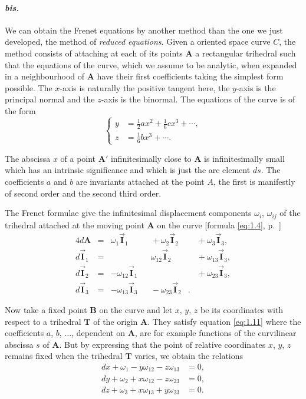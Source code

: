 \documentclass[leqno,11pt]{book}
\numberwithin{equation}{chapter}
\theoremstyle{shape1}
\theoremstyle{shapesmall}
\newcommand{\rvec}[1]{\vec{\mathbf{#1}}}
\newcommand{\ivec}{\rvec{I}}
\begin{document}
\paragraph{\textnormal{\textit{bis.}}}
\label{sec:21a}
We can obtain the Frenet equations by another method than the one we just developed, the method of \emph{reduced equations}. Given a oriented space curve $C$, the method consists of attaching at each of its points $\mathbf{A}$ a rectangular trihedral such that the equations of the curve, which we assume to be analytic, when expanded in a neighbourhood of $\mathbf{A}$ have their first coefficients taking the simplest form possible. The $x$-axis is naturally the positive tangent here, the $y$-axis is the principal normal and the $z$-axis is the binormal. The equations of the curve is of the form
\begin{equation}
  \label{eq:1.11}
  \left\{
    \begin{aligned}      
      y&=\frac{1}{2}ax^{2}+\frac{1}{6}cx^{3}+\cdots,\\
      z&=\frac{1}{6}bx^{3}+\cdots.
    \end{aligned}      
  \right.
\end{equation}

The abscissa $x$ of a point $\mathbf{A}'$ infinitesimally close to $\mathbf{A}$ is infinitesimally small which has an intrinsic significance and which is just the arc element $ds$. The coefficients $a$ and $b$ are invariants attached at the point $A$, the first is manifestly of second order and the second third order.

The Frenet formulae give the infinitesimal displacement components $\omega_{i}$, $\omega_{ij}$ of the trihedral attached at the moving point $\mathbf{A}$ on the curve [formula \eqref{eq:1.4}, p.~\pageref{eq:1.4}]
\begin{alignat*}{4}
  d\mathbf{A}&={}&{}\omega_{1}\ivec_{1}&&{}+{}\omega_{2}\ivec_{2}&&{}+{}\omega_{3}\ivec_{3},\\
  d\ivec_{1}&=&&&\omega_{12}\ivec_{2}&&{}+{}\omega_{13}\ivec_{3},\\
  d\ivec_{2}&=&-\omega_{12}\ivec_{1}&&&&{}+{}\omega_{23}\ivec_{3},\\
  d\ivec_{3}&=&-\omega_{13}\ivec_{3}&&{}-{}\omega_{23}\ivec_{2}&.&
\end{alignat*}

Now take a fixed point $\mathbf{B}$ on the curve and let $x$, $y$, $z$ be its coordinates with respect to a trihedral $\mathbf{T}$ of the origin $\mathbf{A}$. They satisfy equation \eqref{eq:1.11} where the coefficients $a$, $b$, $\dots$, dependent on $\mathbf{A}$, are for example functions of the curvilinear abscissa $s$ of $\mathbf{A}$. But by expressing that the point of relative coordinates $x$, $y$, $z$ remains fixed when the trihedral $\mathbf{T}$ varies, we obtain the relations
\begin{align*}
  dx+\omega_{1}-y\omega_{12}-z\omega_{13}&=0,\\
  dy+\omega_{2}+x\omega_{12}-z\omega_{23}&=0,\\
  dz+\omega_{3}+x\omega_{13}+y\omega_{23}&=0.
\end{align*}
\end{document}

